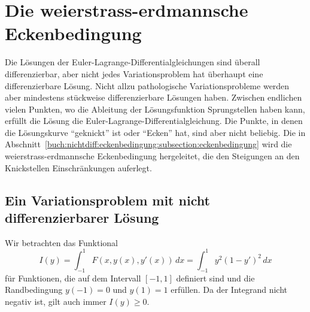 %
%
%
\section{Die weierstrass-erdmannsche Eckenbedingung
\label{buch:nichtdiff:section:ecken}}
Die Lösungen der Euler-Lagrange-Differentialgleichungen sind überall
differenzierbar, aber nicht jedes Variationsproblem hat überhaupt
eine differenzierbare Lösung.
Nicht allzu pathologische Variationsprobleme werden aber mindestens
stückweise differenzierbare Lösungen haben.
Zwischen endlichen vielen Punkten, wo die Ableitung der Lösungsfunktion
Sprungstellen haben kann, erfüllt die Lösung die
Euler-Lagrange-Differentialgleichung.
Die Punkte, in denen die Lösungskurve ``geknickt'' ist oder ``Ecken''
hat, sind aber nicht beliebig.
Die in Abschnitt~\ref{buch:nichtdiff:eckenbedingung:subsection:eckenbedingung}
wird die weierstrass-erdmannsche Eckenbedingung hergeleitet, die
den Steigungen an den Knickstellen Einschränkungen auferlegt.

%
%
\subsection{Ein Variationsproblem mit nicht differenzierbarer Lösung
\label{buch:nichtdiff:eckenbedingung:subsection:problem}}
Wir betrachten das Funktional
\begin{equation}
I(y)
=
\int_{-1}^1 F(x,y(x),y'(x))\,dx
=
\int_{-1}^1 y^2(1-y')^2\,dx
\label{buch:nichtdiff:eckenbedingung:eqn:l}
\end{equation}
für Funktionen, die auf dem Intervall $[-1,1]$ definiert sind und
die Randbedingung $y(-1) = 0$ und $y(1)=1$ erfüllen.
Da der Integrand nicht negativ ist, gilt auch immer $I(y)\ge 0$.

